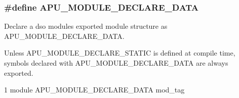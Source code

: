 \subsubsection[{\texorpdfstring{A\+P\+U\+\_\+\+M\+O\+D\+U\+L\+E\+\_\+\+D\+E\+C\+L\+A\+R\+E\+\_\+\+D\+A\+TA}{APU_MODULE_DECLARE_DATA}}]{\setlength{\rightskip}{0pt plus 5cm}\#define A\+P\+U\+\_\+\+M\+O\+D\+U\+L\+E\+\_\+\+D\+E\+C\+L\+A\+R\+E\+\_\+\+D\+A\+TA}\hypertarget{group__APR__Util_ga9b0c0f8fe6546018d3a84a87fc3938f5}{}\label{group__APR__Util_ga9b0c0f8fe6546018d3a84a87fc3938f5}
Declare a dso module\textquotesingle{}s exported module structure as A\+P\+U\+\_\+\+M\+O\+D\+U\+L\+E\+\_\+\+D\+E\+C\+L\+A\+R\+E\+\_\+\+D\+A\+TA.

Unless A\+P\+U\+\_\+\+M\+O\+D\+U\+L\+E\+\_\+\+D\+E\+C\+L\+A\+R\+E\+\_\+\+S\+T\+A\+T\+IC is defined at compile time, symbols declared with A\+P\+U\+\_\+\+M\+O\+D\+U\+L\+E\+\_\+\+D\+E\+C\+L\+A\+R\+E\+\_\+\+D\+A\+TA are always exported. 
\begin{DoxyCode}
1 module APU\_MODULE\_DECLARE\_DATA mod\_tag
\end{DoxyCode}
 